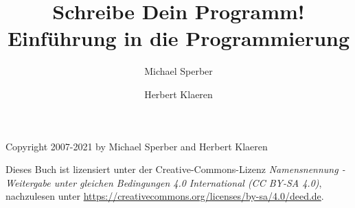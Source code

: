 \documentclass{tup}
\theoremstyle{plain}
\theoremstyle{plain}
\theoremstyle{break}
\begin{document}
\setcounter{tocdepth}{1}
\begin{titlepage}
\title{Schreibe Dein Programm!\\{\large Einführung in die Programmierung}}
\author{Michael Sperber \and Herbert Klaeren}
\maketitle
Copyright \textcopyright{} 2007-2021 by Michael
  Sperber and Herbert Klaeren
  
  Dieses Buch ist lizensiert unter der Creative-Commons-Lizenz
  \textit{Namensnennung - Weitergabe unter gleichen Bedingungen 4.0 International (CC BY-SA 4.0)}, nachzulesen
  unter \url{https://creativecommons.org/licenses/by-sa/4.0/deed.de}.
\end{titlepage}

\thispagestyle{empty}

\tableofcontents

\setcounter{page}{1}


































% 

% 

% 











\printindex
\end{document}
